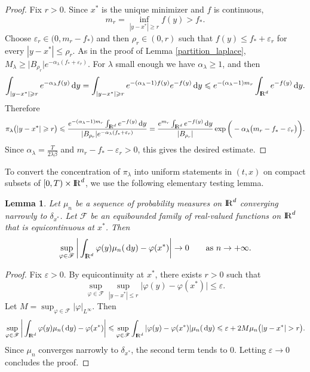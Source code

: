 \documentclass[11pt]{amsart}
\def\R{\mathrm{I\kern-0.21emR}}
\newcommand{\dd}{\,\mathrm{d}}
\renewcommand{\geq}{\geqslant}
\renewcommand{\leq}{\leqslant}
\renewcommand{\Vert}{|}
\numberwithin{equation}{section}
\numberwithin{figure}{section}
\newtheorem{lemma}[theorem]{Lemma}%
\theoremstyle{definition}\newtheorem{remark}[theorem]{Remark}%
\begin{document}
\begin{proof}
Fix $r > 0$. Since $x^*$ is the unique minimizer and $f$ is continuous,
$$
m_r = \inf_{\Vert y - x^* \Vert \geq r} f(y) > f_*.
$$
Choose $\varepsilon_r \in \big( 0, m_r - f_* \big)$ and then $\rho_r \in (0,r)$ such that $f(y) \leq f_* + \varepsilon_r$ for every $\Vert y - x^* \Vert \leq \rho_r$.
As in the proof of Lemma \ref{partition_laplace}, $M_\lambda \geq \vert B_{\rho_r} \vert e^{-\alpha_\lambda(f_* + \varepsilon_r)}$.
For $\lambda$ small enough we have $\alpha_\lambda \geq 1$, and then
$$
\int_{\Vert y - x^* \Vert \geq r} e^{-\alpha_\lambda f(y)}\dd y
= \int_{\Vert y - x^* \Vert \geq r} e^{-(\alpha_\lambda - 1)f(y)}e^{-f(y)}\dd y 
\leq e^{-(\alpha_\lambda - 1)m_r}\int_{\R^d} e^{-f(y)}\dd y.
$$
Therefore
$$
\pi_\lambda\big( \Vert y - x^* \Vert \geq r \big)
\leq \frac{e^{-(\alpha_\lambda - 1)m_r}\int_{\R^d} e^{-f(y)}\dd y}{\vert B_{\rho_r} \vert e^{-\alpha_\lambda(f_* + \varepsilon_r)}} 
= \frac{e^{m_r}\int_{\R^d} e^{-f(y)}\dd y}{\vert B_{\rho_r} \vert} \exp \bigg( - \alpha_\lambda\big( m_r - f_* - \varepsilon_r \big) \bigg).
$$
Since $\displaystyle \alpha_\lambda = \frac{T}{2\lambda\beta}$ and $m_r - f_* - \varepsilon_r > 0$, this gives the desired estimate.
\end{proof}

To convert the concentration of $\pi_\lambda$ into uniform statements in $(t,x)$ on compact subsets of $[0,T) \times \R^d$, we use the following elementary testing lemma.

\begin{lemma}\label{uniform_test}
Let $\mu_n$ be a sequence of probability measures on $\R^d$ converging narrowly to $\delta_{x^*}$. Let $\mathscr F$ be an equibounded family of real-valued functions on $\R^d$ that is equicontinuous at $x^*$. Then
$$
\sup_{\varphi \in \mathscr F} \bigg\vert \int_{\R^d} \varphi(y)\mu_n(\dd y) - \varphi(x^*) \bigg\vert \to 0
\qquad
\text{as } n \to +\infty.
$$
\end{lemma}

\begin{proof}
Fix $\varepsilon > 0$. By equicontinuity at $x^*$, there exists $r > 0$ such that
$$
\sup_{\varphi \in \mathscr F} \sup_{\Vert y - x^* \Vert \leq r} \vert \varphi(y) - \varphi(x^*) \vert \leq \varepsilon.
$$
Let $M = \sup_{\varphi \in \mathscr F} \Vert \varphi \Vert_{L^\infty}$. Then
$$
\sup_{\varphi \in \mathscr F} \bigg\vert \int_{\R^d} \varphi(y)\mu_n(\dd y) - \varphi(x^*) \bigg\vert
\leq \sup_{\varphi \in \mathscr F} \int_{\R^d} \vert \varphi(y) - \varphi(x^*) \vert \mu_n(\dd y)
\leq \varepsilon + 2M\mu_n\big( \Vert y - x^* \Vert > r \big).
$$
Since $\mu_n$ converges narrowly to $\delta_{x^*}$, the second term tends to $0$. Letting $\varepsilon \to 0$ concludes the proof.
\end{proof}
\end{document}
